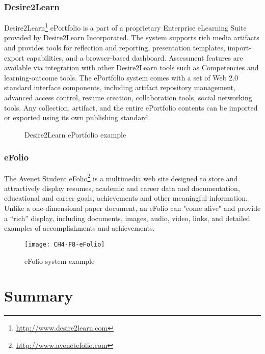 \subsubsection{Desire2Learn}
Desire2Learn\footnote{\url{http://www.desire2learn.com}} ePortfolio is a part of
a proprietary Enterprise eLearning Suite provided by Desire2Learn Incorporated.
The system supports rich media artifacts and provides tools for reflection and
reporting, presentation templates, import-export capabilities, and a
browser-based dashboard. Assessment features are available via integration with
other Desire2Learn tools such as Competencies and learning-outcome tools. The
ePortfolio system comes with a set of Web 2.0 standard interface components,
including artifact repository management, advanced access control, resume
creation, collaboration tools, social networking tools. Any collection,
artifact, and the entire ePortfolio contents can be imported or exported using
its own publishing standard.

\begin{figure}[htb]
\centering
\setlength\fboxsep{0pt}
\setlength\fboxrule{0.5pt}
\fbox{\texttt{[image: CH4-F7-D2L]}}
\caption[Desire2Learn ePortfolio example]{Desire2Learn ePortfolio example
\citep{Desire2LearnIncorporated2011}}
\label{fig:d2ep}
\end{figure}
 
\subsubsection{eFolio}

The Avenet Student eFolio\footnote{\url{http://www.avenetefolio.com}} is a
multimedia web site designed to store and attractively display resumes, academic
and career data and documentation, educational and career goals, achievements
and other meaningful information. Unlike a one-dimensional paper document, an
eFolio can "come alive" and provide a ``rich'' display, including documents,
images, audio, video, links, and detailed examples of accomplishments and
achievements.

\begin{figure}[htb]
\centering
\setlength\fboxsep{0pt}
\setlength\fboxrule{0.5pt}
\texttt{[image: CH4-F8-eFolio]}
\caption[eFolio system example]{eFolio system example \citep{EFolioMinnesota2011}}
\label{fig:efolio}
\end{figure}

\section{Summary}

